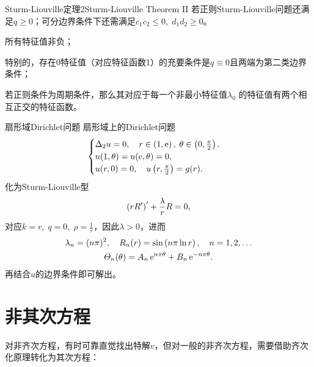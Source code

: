 \begin{theorem}{Sturm-Liouville定理2}{Sturm-Liouville Theorem II}
	若正则Sturm-Liouville问题还满足$q\geqslant 0$；可分边界条件下还需满足$c_1c_2\leqslant 0,\;d_1d_2\geqslant 0$。
	\begin{compactenum}
		\item 所有特征值非负；

		      特别的，存在0特征值（对应特征函数1）的充要条件是$q\equiv 0$且两端为第二类边界条件；
		\item 若正则条件为周期条件，那么其对应于每一个非最小特征值$\lambda_0$
		的特征值有两个相互正交的特征函数。
	\end{compactenum}
\end{theorem}
\begin{example}{扇形域Dirichlet问题}{}
	扇形域上的Dirichlet问题
	\begin{align*}
		\begin{cases}
			\Delta_2u=0,\quad r\in\left(1,\mathrm e\right),\;\theta\in\left(0,\frac\pi{2}\right).\\
			u(1,\theta)=u(\mathrm e,\theta)=0,\\
			u(r,0)=0,\quad u\left(r,\frac\pi{2}\right)=g(r).
		\end{cases}
	\end{align*}
	化为Sturm-Liouville型
	\[
		\left(rR'\right)'+\frac{\lambda}rR=0,
	\]
	对应\(k=r,\;q=0,\;\rho=\frac1r\)，因此\(\lambda>0\)，进而
	\begin{gather*}
		\lambda_n=(n\pi)^2,\quad R_n(r)=\sin\left(n\pi\ln r\right),\quad n=1,2,\ldots
		\\
		\varTheta_n(\theta)=A_n\mathop{}\!\mathrm{e}^{n\pi\theta}+B_n\mathop{}\!\mathrm{e}^{-n\pi\theta}.
	\end{gather*}
	再结合$u$的边界条件即可解出。
\end{example}

\section{非其次方程}

对非齐次方程，有时可靠直觉找出特解$v$，但对一般的非齐次方程，需要借助齐次化原理转化为其次方程：

